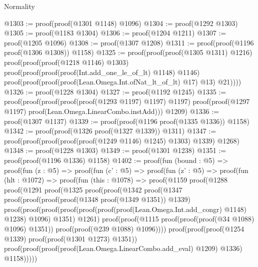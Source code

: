 \begin{lexlean}{Normality}
\begin{coremodule}
@1303 := proof(proof(@1301 @1148) @1096)
@1304 := proof(@1292 @1303)
@1305 := proof(@1183 @1304)
@1306 := proof(@1204 @1211)
@1307 := proof(@1205 @1096)
@1308 := proof(@1307 @1208)
@1311 := proof(proof(@1196 proof(@1306 @1308)) @1158)
@1325 := proof(proof(proof(@1305 @1311) @1216)
      proof(proof(proof(@1218 @1146) @1303)
          proof(proof(proof(proof(Int.add_one_le_of_lt) @1148) @1146)
              proof(proof(proof(proof(Lean.Omega.Int.ofNat_lt_of_lt) @17) @13) @21))))
@1326 := proof(@1228 @1304)
@1327 := proof(@1192 @1245)
@1335 := proof(proof(proof(proof(proof(@1293 @1197) @1197) @1197)
        proof(proof(@1297 @1197) proof(Lean.Omega.LinearCombo.instAdd)))
      @1209)
@1336 := proof(@1307 @1137)
@1339 := proof(proof(@1196 proof(@1335 @1336)) @1158)
@1342 := proof(proof(@1326 proof(@1327 @1339)) @1311)
@1347 := proof(proof(proof(proof(proof(@1249 @1146) @1245) @1303) @1339) @1268)
@1348 := proof(@1228 @1303)
@1349 := proof(@1301 @1238)
@1351 := proof(proof(@1196 @1336) @1158)
@1402 := proof(fun (bound : @5) =>
    proof(fun (z : @5) =>
      proof(fun (c' : @5) =>
        proof(fun (z' : @5) =>
          proof(fun (hlt : @1072) =>
            proof(fun (this : @1078) =>
              proof(@1159
                  proof(@1288
                      proof(@1291
                          proof(@1325
                              proof(proof(@1342
                                    proof(@1347
                                        proof(proof(proof(proof(@1348 proof(@1349 @1351)) @1339)
                                              proof(proof(proof(proof(proof(proof(proof(Lean.Omega.Int.add_congr)
                                                            @1148)
                                                          @1238)
                                                        @1096)
                                                      @1351)
                                                    @1261)
                                                  proof(proof(@1115
                                                        proof(proof(proof(@34 @1088) @1096) @1351))
                                                      proof(proof(@239 @1088) @1096))))
                                            proof(proof(proof(@1254 @1339)
                                                  proof(proof(@1301 @1273) @1351))
                                                proof(proof(proof(proof(Lean.Omega.LinearCombo.add_eval)
                                                        @1209)
                                                      @1336)
                                                    @1158)))))

\end{coremodule}
\end{lexlean}
